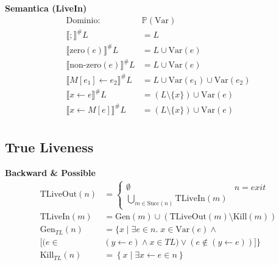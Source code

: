 \documentclass[a4paper,12pt,openany]{article}
\newcommand{\TL}{T\!L}
\begin{document}
\textbf{Semantica (LiveIn)}
\begin{align*}
\mbox{Dominio: }& \mathbb{P}(\mbox{Var})\\
\llbracket ; \rrbracket^\#L &= L\\
\llbracket \mbox{zero}(e) \rrbracket^\#L &= L \cup \mbox{Var}(e)\\
\llbracket \mbox{non-zero}(e) \rrbracket^\#L &= L \cup \mbox{Var}(e)\\
\llbracket M[e_1]\leftarrow e_2 \rrbracket^\#L &= L \cup \mbox{Var}(e_1) \cup \mbox{Var}(e_2)\\
\llbracket x \leftarrow e \rrbracket^\#L &= (L\setminus \{x\}) \cup \mbox{Var}(e)\\
\llbracket x\leftarrow M[e] \rrbracket^\#L &= (L\setminus \{x\}) \cup \mbox{Var}(e)\\
\end{align*}


\clearpage
\subsection{True Liveness}
\textbf{Backward \& Possible}
\begin{align*}
\mbox{TLiveOut}(n) &=
\begin{cases}
\emptyset & n = exit\\
\bigcup\limits_{m\in \mbox{Succ}(n)} \mbox{TLiveIn}(m)
\end{cases}\\
\mbox{TLiveIn}(m) &= \mbox{Gen}(m) \cup (\mbox{TLiveOut}(m) \setminus \mbox{Kill}(m))\\
\mbox{Gen}_{\TL}(n) &= \{
x \;\big\vert\; \exists e \in n.\; x\in\mbox{Var}(e) \wedge \\
[(e \in& (y \leftarrow e) \wedge x \in TL) \vee (e \notin (y \leftarrow e))]
\}\\
\mbox{Kill}_{\TL}(n) &= \left\{
x \;\big\vert\; \exists x\leftarrow e \in n
\right\}
\end{align*}
\end{document}
